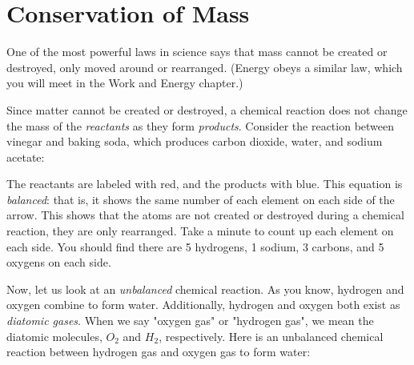 \section{Conservation of Mass}\label{chap:conservationMass}
One of the most powerful laws in science says that mass cannot be created or destroyed, only moved around or rearranged. (Energy obeys a similar law, which you will meet in the Work and Energy chapter.)

Since matter cannot be created or destroyed, a chemical reaction does not change 
the mass of the \textit{reactants} as they form \textit{products}. Consider the reaction between 
vinegar and baking soda, which produces carbon dioxide, water, and sodium acetate:

\begin{center}
\end{center}

The reactants are labeled with red, and the products with blue. This equation is
\textit{balanced}: that is, it shows the same number of each element on each side
of the arrow. This shows that the atoms are not created or destroyed during a 
chemical reaction, they are only rearranged. Take a minute to count up each 
element on each side. You should find there are 5 hydrogens, 1 sodium, 3 carbons,
and 5 oxygens on each side. 

Now, let us look at an \textit{unbalanced} chemical reaction. As you know, hydrogen
and oxygen combine to form water. Additionally, hydrogen and oxygen both exist as
\textit{diatomic gases}. When we say "oxygen gas" or "hydrogen gas", we mean the 
diatomic molecules, $O_2$ and $H_2$, respectively. Here is an unbalanced chemical 
reaction between hydrogen gas and oxygen gas to form water:


